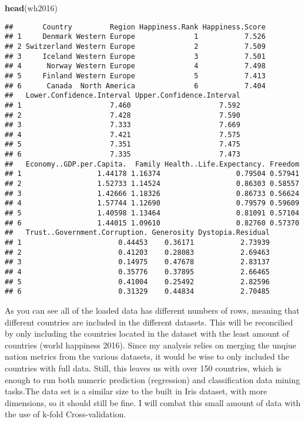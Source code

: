\documentclass[]{article}
\newenvironment{Shaded}{\begin{snugshade}}{\end{snugshade}}
\newcommand{\KeywordTok}[1]{\textcolor[rgb]{0.13,0.29,0.53}{\textbf{#1}}}
\newcommand{\NormalTok}[1]{#1}
\begin{document}
\begin{Shaded}
\begin{Highlighting}[]
\KeywordTok{head}\NormalTok{(wh2016)}
\end{Highlighting}
\end{Shaded}

\begin{verbatim}
##       Country         Region Happiness.Rank Happiness.Score
## 1     Denmark Western Europe              1           7.526
## 2 Switzerland Western Europe              2           7.509
## 3     Iceland Western Europe              3           7.501
## 4      Norway Western Europe              4           7.498
## 5     Finland Western Europe              5           7.413
## 6      Canada  North America              6           7.404
##   Lower.Confidence.Interval Upper.Confidence.Interval
## 1                     7.460                     7.592
## 2                     7.428                     7.590
## 3                     7.333                     7.669
## 4                     7.421                     7.575
## 5                     7.351                     7.475
## 6                     7.335                     7.473
##   Economy..GDP.per.Capita.  Family Health..Life.Expectancy. Freedom
## 1                  1.44178 1.16374                  0.79504 0.57941
## 2                  1.52733 1.14524                  0.86303 0.58557
## 3                  1.42666 1.18326                  0.86733 0.56624
## 4                  1.57744 1.12690                  0.79579 0.59609
## 5                  1.40598 1.13464                  0.81091 0.57104
## 6                  1.44015 1.09610                  0.82760 0.57370
##   Trust..Government.Corruption. Generosity Dystopia.Residual
## 1                       0.44453    0.36171           2.73939
## 2                       0.41203    0.28083           2.69463
## 3                       0.14975    0.47678           2.83137
## 4                       0.35776    0.37895           2.66465
## 5                       0.41004    0.25492           2.82596
## 6                       0.31329    0.44834           2.70485
\end{verbatim}

As you can see all of the loaded data has different numbers of rows,
meaning that different countries are included in the different datasets.
This will be reconcilied by only including the countries located in the
dataset with the least amount of countries (world happiness 2016). Since
my analysis relies on merging the unqiue nation metrics from the various
datasets, it would be wise to only included the countries with full
data. Still, this leaves us with over 150 countries, which is enough to
run both numeric prediction (regression) and classification data mining
tasks.The data set is a similar size to the built in Iris dataset, with
more dimensions, so it should still be fine. I will combat this small
amount of data with the use of k-fold Cross-validation.
\end{document}
